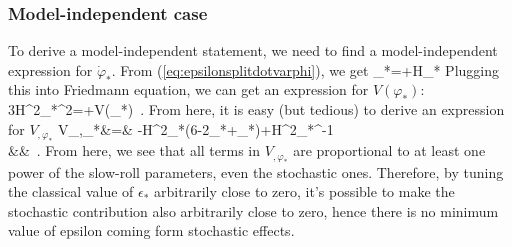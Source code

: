 \documentclass[useAMS,usenatbib,a4paper,onecolumn]{mn2e}
\begin{document}
\subsubsection{Model-independent case}
To derive a model-independent statement, we need to find a model-independent expression for $\dot\varphi_*$.
From (\ref{eq:epsilonsplitdotvarphi}), we get
\be
	\dot\varphi_*=+H_*\Mp{}
\ee
Plugging this into Friedmann equation, we can get an expression for $V(\varphi_*)$:
\be
	3H^2_*\Mp^2=+V(\varphi_*)\, .
\ee
From here, it is easy (but tedious) to derive an expression for $V_{,\varphi_*}$
\bea
	V_{,\varphi_*}&=& -\Mp H^2_*(6-2\epsilon_*+\eta_*)+H^2_*^{-1}\nonumber\\
	&&\qquad\times{}\, .
\eea
From here, we see that all terms in $V_{,\varphi_*}$ are proportional to at least one power of the slow-roll parameters, even the stochastic ones. Therefore, by tuning the classical value of $\epsilon_*$ arbitrarily close to zero, it's possible to make the stochastic contribution also arbitrarily close to zero, hence there is no minimum value of epsilon coming form stochastic effects.

\end{document}
